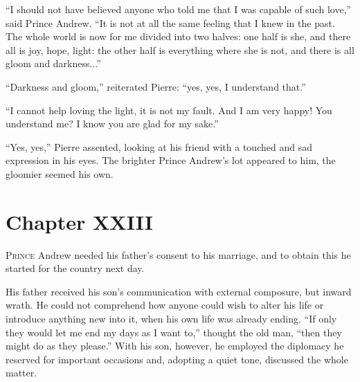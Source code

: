 ``I should not have believed anyone who told me that I was
capable of such love,'' said Prince Andrew. ``It is not at all
the same feeling that I knew in the past. The whole world is now
for me divided into two halves: one half is she, and there all is
joy, hope, light: the other half is everything where she is not,
and there is all gloom and darkness...''

``Darkness and gloom,'' reiterated Pierre: ``yes, yes, I
understand that.''

``I cannot help loving the light, it is not my fault. And I am
very happy! You understand me? I know you are glad for my sake.''

``Yes, yes,'' Pierre assented, looking at his friend with a
touched and sad expression in his eyes. The brighter Prince
Andrew's lot appeared to him, the gloomier seemed his own.


\chapter*{Chapter XXIII}
\ifaudio     
{} 
\fi

\lettrine[lines=2, loversize=0.3, lraise=0]{\initfamily P}{rince}
Andrew needed his father's consent to his marriage, and to
obtain this he started for the country next day.

His father received his son's communication with external
composure, but inward wrath. He could not comprehend how anyone
could wish to alter his life or introduce anything new into it,
when his own life was already ending. ``If only they would let me
end my days as I want to,'' thought the old man, ``then they
might do as they please.'' With his son, however, he employed the
diplomacy he reserved for important occasions and, adopting a
quiet tone, discussed the whole matter.

